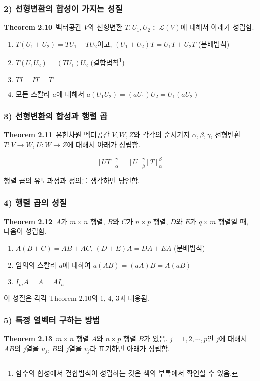 \documentclass[10pt, a4paper]{article}
\begin{document}
\subsubsection*{2) 선형변환의 합성이 가지는 성질}
\textbf{Theorem 2.10}\, 벡터공간 $V$와 선형변환 $T,U_1,U_2 \in \mathcal{L}(V)$에 대해서 아래가 성립함.

\begin{enumerate}
    \item $T(U_1+U_2)=TU_1+TU_2$이고, $(U_1+U_2)T=U_1T+U_2T$ (분배법칙)
    \item $T(U_1U_2)=(TU_1)U_2$ (결합법칙\footnote{함수의 합성에서 결합법칙이 성립하는 것은 책의 부록에서 확인할 수 있음.})
    \item $TI=IT=T$
    \item 모든 스칼라 $a$에 대해서 $a(U_1U_2)=(aU_1)U_2=U_1(aU_2)$
\end{enumerate}

\subsubsection*{3) 선형변환의 합성과 행렬 곱}
\textbf{Theorem 2.11}\, 유한차원 벡터공간 $V,W,Z$와 각각의 순서기저 $\alpha,\beta,\gamma$, 선형변환 $T:V \rightarrow W$, $U:W \rightarrow Z$에 대해서 아래가 성립함.

\[
[UT]_{\alpha}^{\gamma}=[U]_{\beta}^{\gamma}[T]_{\alpha}^{\beta}
\]

행렬 곱의 유도과정과 정의를 생각하면 당연함.

\subsubsection*{4) 행렬 곱의 성질}
\textbf{Theorem 2.12}\, $A$가 $m \times n$ 행렬, $B$와 $C$가 $n \times p$ 행렬, $D$와 $E$가 $q \times m$ 행렬일 때, 다음이 성립함.

\begin{enumerate}
    \item $A(B+C)=AB+AC,\,(D+E)A=DA+EA$ (분배법칙)
    \item 임의의 스칼라 $a$에 대하여 $a(AB)=(aA)B=A(aB)$
    \item $I_{m}A=A=AI_{n}$
\end{enumerate}

이 성질은 각각 Theorem 2.10의 1, 4, 3과 대응됨.

\subsubsection*{5) 특정 열벡터 구하는 방법}
\textbf{Theorem 2.13}\, $m \times n$ 행렬 $A$와 $n \times p$ 행렬 $B$가 있음. $j=1,2, \cdots ,p$인 $j$에 대해서 $AB$의 $j$열을 $u_j$, $B$의 $j$열을 $v_j$라 표기하면 아래가 성립함.
\end{document}
